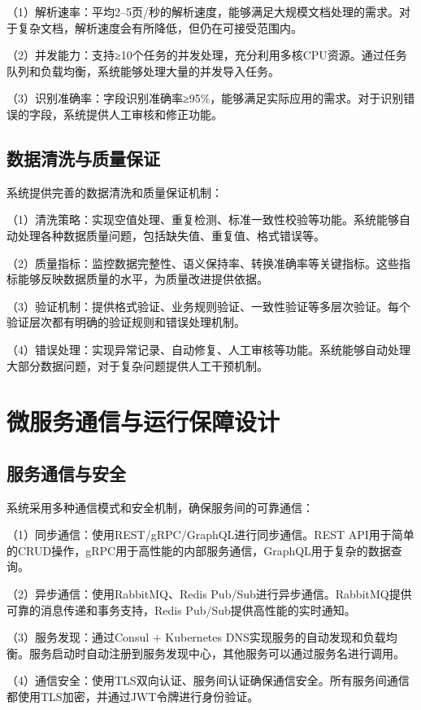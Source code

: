 （1）解析速率：平均2–5页/秒的解析速度，能够满足大规模文档处理的需求。对于复杂文档，解析速度会有所降低，但仍在可接受范围内。

（2）并发能力：支持≥10个任务的并发处理，充分利用多核CPU资源。通过任务队列和负载均衡，系统能够处理大量的并发导入任务。

（3）识别准确率：字段识别准确率≥95\%，能够满足实际应用的需求。对于识别错误的字段，系统提供人工审核和修正功能。

\subsection{数据清洗与质量保证}

系统提供完善的数据清洗和质量保证机制：

（1）清洗策略：实现空值处理、重复检测、标准一致性校验等功能。系统能够自动处理各种数据质量问题，包括缺失值、重复值、格式错误等。

（2）质量指标：监控数据完整性、语义保持率、转换准确率等关键指标。这些指标能够反映数据质量的水平，为质量改进提供依据。

（3）验证机制：提供格式验证、业务规则验证、一致性验证等多层次验证。每个验证层次都有明确的验证规则和错误处理机制。

（4）错误处理：实现异常记录、自动修复、人工审核等功能。系统能够自动处理大部分数据问题，对于复杂问题提供人工干预机制。

\section{微服务通信与运行保障设计}

\subsection{服务通信与安全}

系统采用多种通信模式和安全机制，确保服务间的可靠通信：

（1）同步通信：使用REST/gRPC/GraphQL进行同步通信。REST API用于简单的CRUD操作，gRPC用于高性能的内部服务通信，GraphQL用于复杂的数据查询。

（2）异步通信：使用RabbitMQ、Redis Pub/Sub进行异步通信。RabbitMQ提供可靠的消息传递和事务支持，Redis Pub/Sub提供高性能的实时通知。

（3）服务发现：通过Consul + Kubernetes DNS实现服务的自动发现和负载均衡。服务启动时自动注册到服务发现中心，其他服务可以通过服务名进行调用。

（4）通信安全：使用TLS双向认证、服务间认证确保通信安全。所有服务间通信都使用TLS加密，并通过JWT令牌进行身份验证。

